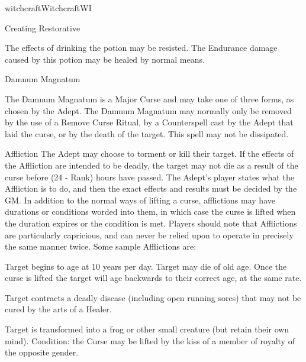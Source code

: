 \begin{College}[1.1]{witchcraft}{Witchcraft}{WI}
\begin{spell}[S-9]{Creating Restorative}
\begin{effects}
The effects of drinking the potion may be resisted.  The Endurance
damage caused by this potion may be healed by normal means.

\end{effects}
\end{spell}

\begin{spell}[S-10]{Damnum Magnatum}

\begin{effects}
The Damnum Magnatum is a Major Curse and may take one of three forms,
as chosen by the Adept.  The Damnum Magnatum may normally only be
removed by the use of a Remove Curse Ritual, by a Counterspell cast by
the Adept that laid the curse, or by the death of the target.  This
spell may not be dissipated.

\begin{Description}
\item[Affliction] The Adept may choose to torment or kill their
  target.  If the effects of the Affliction are intended to be
  deadly, the target may not die as a result of the curse before (24 -
  Rank) hours have passed.  The Adept’s player states what the
  Affliction is to do, and then the exact effects and results must be
  decided by the GM.  In addition to the normal ways of lifting a
  curse, afflictions may have durations or conditions worded into
  them, in which case the curse is lifted when the duration expires or
  the condition is met.  Players should note that Afflictions are
  particularly capricious, and can never be relied upon to operate in
  precisely the same manner twice. Some sample Afflictions are:
\begin{Itemize}
\item Target begins to age at 10 years per day. Target may die of old
  age.  Once the curse is lifted the target will age backwards to
  their correct age, at the same rate.

\item Target contracts a deadly disease (including open running sores)
  that may not be cured by the arts of a Healer.

\item Target is transformed into a frog or other small creature (but
  retain their own mind). Condition: the Curse may be lifted by the
  kiss of a member of royalty of the opposite gender.


\end{Itemize}
\end{Description}
\end{effects}
\end{spell}
\end{College}
